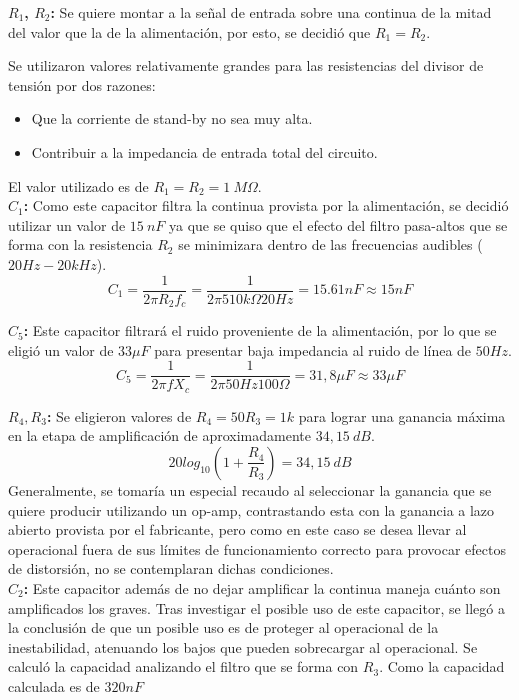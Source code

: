 \textbf{$R_1$, $R_2$:} Se quiere montar a la señal de entrada sobre una continua de la mitad del valor que la de la alimentación, por esto, se decidió que $R_1=R_2$.

Se utilizaron valores relativamente grandes para las resistencias del divisor de tensión por dos razones:
\begin{itemize}
\item Que la corriente de stand-by no sea muy alta.
\item Contribuir a la impedancia de entrada total del circuito.
\end{itemize}
El valor utilizado es de $R_1=R_2=1 \ M\Omega$.\\

\textbf{$C_1$:} Como este capacitor filtra la continua provista por la alimentación, se decidió utilizar un valor de $15 \ nF$ ya que se quiso que el efecto del filtro pasa-altos que se forma con la resistencia $R_2$ se minimizara dentro de las frecuencias audibles ($20Hz-20kHz$).
\[ C_1=\frac{1}{2\pi R_2 f_c} = \frac{1}{2\pi 510k\Omega 20Hz} = 15.61nF \approx 15nF\]

\textbf{$C_5$:} Este capacitor filtrará el ruido proveniente de la alimentación, por lo que se eligió un valor de $33\mu F$ para presentar baja impedancia al ruido de línea de $50Hz$.
\[C_5 = \frac{1}{2\pi f X_c} = \frac{1}{2\pi 50Hz 100\Omega} = 31,8\mu F \approx 33\mu F\]

\textbf{$R_4, R_3$:} Se eligieron valores de $R_4=50R_3=1k$ para lograr una ganancia máxima en la etapa de amplificación de aproximadamente $34,15 \ dB$.
\[20log_{10}(1+\frac{R_4}{R_3}) = 34,15 \ dB\]
Generalmente, se tomaría un especial recaudo al seleccionar la ganancia que se quiere producir utilizando un op-amp, contrastando esta con la ganancia a lazo abierto provista por el fabricante, pero como en este caso se desea llevar al operacional fuera de sus límites de funcionamiento correcto para provocar efectos de distorsión, no se contemplaran dichas condiciones.\\

\textbf{$C_2$:} Este capacitor además de no dejar amplificar la continua maneja cuánto son amplificados los graves. Tras investigar el posible uso de este capacitor, se llegó a la conclusión de que un posible uso es de proteger al operacional de la inestabilidad, atenuando los bajos que pueden sobrecargar al operacional. Se calculó la capacidad analizando el filtro que se forma con $R_3$. Como la capacidad calculada es de $320nF$ 

